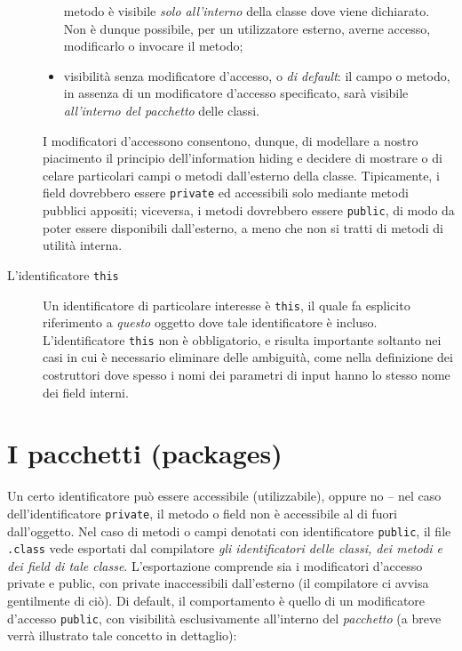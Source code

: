 \documentclass[\fontsizeclass,twocolumn]{\classname}
\theoremstyle{definition}
\theoremstyle{definition}
\begin{document}
\begin{description}
\begin{itemize}
        metodo è visibile \emph{solo all'interno} della classe dove viene
        dichiarato. Non è dunque possibile, per un utilizzatore esterno, averne
        accesso, modificarlo o invocare il metodo;
    \item visibilità senza modificatore d'accesso, o \emph{di default}: il
        campo o metodo, in assenza di un modificatore d'accesso specificato,
        sarà visibile \emph{all'interno del pacchetto} delle classi.
\end{itemize}
    I modificatori d'accessono consentono, dunque, di modellare a nostro
    piacimento il principio dell'information hiding e decidere di mostrare o di
    celare particolari campi o metodi dall'esterno della classe. Tipicamente, i
    field dovrebbero essere \texttt{private} ed accessibili solo mediante
    metodi pubblici appositi; viceversa, i metodi dovrebbero essere
    \texttt{public}, di modo da poter essere disponibili dall'esterno, a meno che
    non si tratti di metodi di utilità interna.
    \item[L'identificatore \texttt{this}] Un identificatore di particolare
        interesse è \texttt{this}, il quale fa esplicito riferimento a
        \emph{questo} oggetto dove tale identificatore è incluso.
        L'identificatore \texttt{this} non è obbligatorio, e risulta importante
        soltanto nei casi in cui è necessario eliminare delle ambiguità, come
        nella definizione dei costruttori dove spesso i nomi dei parametri di
        input hanno lo stesso nome dei field interni.
\end{description}


\chapter{I pacchetti (packages)} 

Un certo identificatore può essere accessibile (utilizzabile), oppure no \--- nel caso dell'identificatore \texttt{private}, il metodo o field non è accessibile al di fuori dall'oggetto. Nel caso di metodi o campi denotati con identificatore \texttt{public}, il file \texttt{.class} vede esportati dal compilatore \emph{gli identificatori delle classi, dei metodi e dei field di tale classe}. L'esportazione comprende sia i modificatori d'accesso private e public, con private inaccessibili dall'esterno (il compilatore ci avvisa gentilmente di ciò). Di default, il comportamento è quello di un modificatore d'accesso \texttt{public}, con visibilità esclusivamente all'interno del \emph{pacchetto} (a breve verrà illustrato tale concetto in dettaglio):
\end{document}
